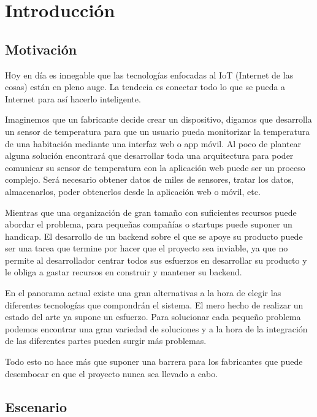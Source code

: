 \chapter{Introducción}\label{chp-01}

\section{Motivación}

\lettrine[lraise=-0.1, lines=2, loversize=0.2]{H}oy en día es innegable que
las tecnologías enfocadas al IoT (Internet de las
cosas) están en pleno auge. La tendecia es conectar todo lo que se pueda a
Internet para así hacerlo inteligente.

Imaginemos que un fabricante decide crear un dispositivo, digamos que desarrolla
un sensor de temperatura para que un usuario pueda monitorizar la temperatura
de una habitación mediante una interfaz web o app móvil. Al poco de plantear
alguna solución encontrará que desarrollar toda una arquitectura para poder
comunicar su sensor de temperatura con la aplicación web puede ser un proceso
complejo. Será necesario obtener datos de miles de sensores, tratar los datos,
almacenarlos, poder obtenerlos desde la aplicación web o móvil, etc.

Mientras que una organización de gran tamaño con suficientes recursos puede
abordar el problema, para pequeñas compañías o startups puede suponer un
handicap. El desarrollo de un backend sobre el que se apoye su producto puede
ser una tarea que termine por hacer que el proyecto sea inviable, ya que no
permite al desarrollador centrar todos sus esfuerzos en desarrollar su producto
y le obliga a gastar recursos en construir y mantener su backend.

En el panorama actual existe una gran alternativas a la hora de elegir las
diferentes tecnologías que compondrán el sistema. El mero hecho de realizar
un estado del arte ya supone un esfuerzo. Para solucionar cada pequeño problema
podemos encontrar una gran variedad de soluciones y a la hora de la integración
de las diferentes partes pueden surgir más problemas.

Todo esto no hace más que suponer una barrera para los fabricantes que puede
desembocar en que el proyecto nunca sea llevado a cabo.

\section{Escenario}

